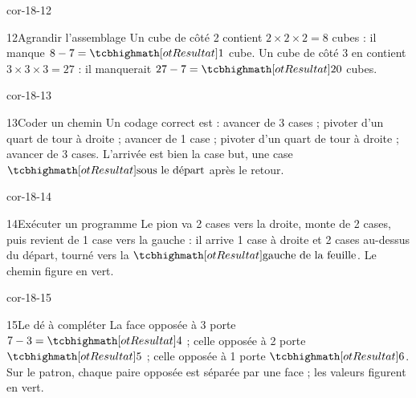 \begin{blocLivre}{cor-18-12}\begin{corrige}{12}{Agrandir l’assemblage}
Un cube de côté 2 contient $2\times2\times2=8$ cubes : il manque $8-7=\res1$ cube. Un cube de côté 3 en contient $3\times3\times3=27$ : il manquerait $27-7=\res{20}$ cubes.
\label{fig-cor-18-12}
\end{corrige}\end{blocLivre}
\begin{blocLivre}{cor-18-13}\begin{corrige}{13}{Coder un chemin}
Un codage correct est : avancer de 3 cases ; pivoter d’un quart de tour à droite ; avancer de 1 case ; pivoter d’un quart de tour à droite ; avancer de 3 cases. L’arrivée est bien la case but, une case $\res{\text{sous le départ}}$ après le retour.
\label{fig-cor-18-13}
\end{corrige}\end{blocLivre}
\begin{blocLivre}{cor-18-14}\begin{corrige}{14}{Exécuter un programme}
Le pion va 2 cases vers la droite, monte de 2 cases, puis revient de 1 case vers la gauche : il arrive 1 case à droite et 2 cases au-dessus du départ, tourné vers la $\res{\text{gauche de la feuille}}$. Le chemin figure en vert.
\label{fig-cor-18-14}
\end{corrige}\end{blocLivre}
\begin{blocLivre}{cor-18-15}\begin{corrige}{15}{Le dé à compléter}
La face opposée à 3 porte $7-3=\res4$ ; celle opposée à 2 porte $\res5$ ; celle opposée à 1 porte $\res6$. Sur le patron, chaque paire opposée est séparée par une face ; les valeurs figurent en vert.
\label{fig-cor-18-15}
\end{corrige}\end{blocLivre}
